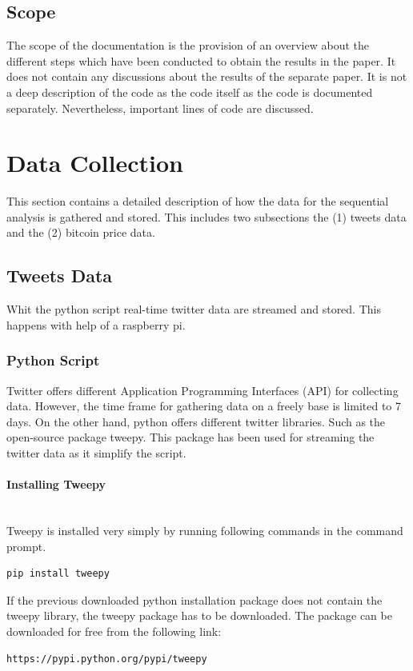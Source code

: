 \documentclass[a4paper,12pt]{article}
\begin{document}
\begin{spacing}{1.2}
\subsection{Scope}
The scope of the documentation is the provision of an overview about the different steps which have been conducted to obtain the results in the paper. It does not contain any discussions about the results of the separate paper. It is not a deep description of the code as the code itself as the code is documented separately. Nevertheless, important lines of code are discussed. 
\clearpage 


\section{Data Collection}
This section contains a detailed description of how the data for the sequential analysis is gathered and stored. This includes two  subsections the (1) tweets data and the (2) bitcoin price data.
\subsection{Tweets Data}
Whit the python script real-time twitter data are streamed and stored. This happens with help of a raspberry pi.
\subsubsection{Python Script}
Twitter offers different Application Programming Interfaces (API) for collecting data. However, the time frame for gathering data on a freely base is limited to 7 days. On the other hand, python offers different twitter libraries. Such as the open-source package tweepy. This package has been used for streaming the twitter data as it simplify the script.

\paragraph{Installing Tweepy}\mbox{}\\{}
Tweepy is installed very simply by running following commands in the command prompt. 
\begin{lstlisting}[language=bash]
pip install tweepy
\end{lstlisting}

If the previous downloaded python installation package does not contain the tweepy library, the tweepy package has to be downloaded. The package can be downloaded for free from the following link:
\begin{lstlisting}[language=bash]
https://pypi.python.org/pypi/tweepy
\end{lstlisting}


\end{spacing}
\end{document}
